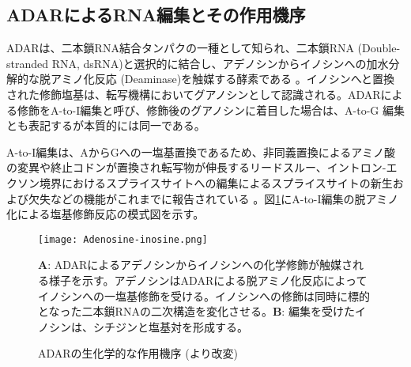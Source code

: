 \subsection{ADARによるRNA編集とその作用機序}
ADARは、二本鎖RNA結合タンパクの一種として知られ、二本鎖RNA (Double-stranded RNA, dsRNA)と選択的に結合し、アデノシンからイノシンへの加水分解的な脱アミノ化反応 (Deaminase)を触媒する酵素である \citep{Bas02, KeeLerSpr04, ValNis05}。イノシンへと置換された修飾塩基は、転写機構においてグアノシンとして認識される。ADARによる修飾をA-to-I編集と呼び、修飾後のグアノシンに着目した場合は、A-to-G 編集とも表記するが本質的には同一である。
\par
A-to-I編集は、AからGへの一塩基置換であるため、非同義置換によるアミノ酸の変異や終止コドンが置換され転写物が伸長するリードスルー、イントロン-エクソン境界におけるスプライスサイトへの編集によるスプライスサイトの新生および欠失などの機能がこれまでに報告されている \citep{MenCheJin10, FloKniSha04, FukIto1012}。図\ref{fig:Chemical_reaction}にA-to-I編集の脱アミノ化による塩基修飾反応の模式図を示す。
\begin{figure}[!h]
	\begin{center}
		\texttt{[image: Adenosine-inosine.png]}
	\end{center}
	\caption{ADARの生化学的な作用機序 (\cite{Nis10}より改変)}
	\begin{flushleft}
		\small{\textbf{A}: ADARによるアデノシンからイノシンへの化学修飾が触媒される様子を示す。アデノシンはADARによる脱アミノ化反応によってイノシンへの一塩基修飾を受ける。イノシンへの修飾は同時に標的となった二本鎖RNAの二次構造を変化させる。\textbf{B}: 編集を受けたイノシンは、シチジンと塩基対を形成する。}
	\end{flushleft}
	\label{fig:Chemical_reaction}
\end{figure}

